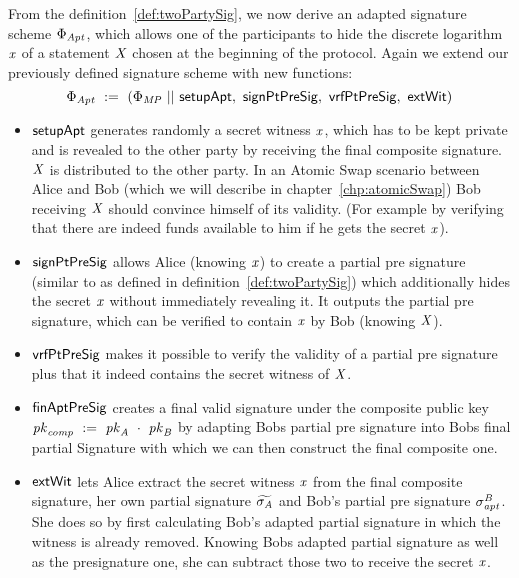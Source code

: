 
\begin{definition}
    \label{def:twoPartyFixedWitAptSig}
    From the definition~\ref{def:twoPartySig}, we now derive an adapted signature scheme $\Phi_{\mathit{Apt}}$, which allows one of the participants to hide the discrete logarithm $\mathit{x}$ of a statement $\mathit{X}$ chosen
    at the beginning of the protocol. Again we extend our previously defined signature scheme with new functions:
    \[ \Phi_{\mathit{Apt}} ~:=~ (\Phi_{\mathit{MP}} ~||~ \mathsf{setupApt} ,~ \mathsf{signPtPreSig} ,~ \mathsf{vrfPtPreSig} ,~ \mathsf{extWit}) \]
    \begin{itemize}
        \item $\mathsf{setupApt}$ generates randomly a secret witness $\mathit{x}$, which has to be kept private and is revealed to the other party by receiving the final composite signature. $\mathit{X}$ is distributed
        to the other party. In an Atomic Swap scenario between Alice and Bob (which we will describe in chapter~\ref{chp:atomicSwap}) Bob receiving $\mathit{X}$ should convince himself of its validity. (For example by verifying that
        there are indeed funds available to him if he gets the secret $\mathit{x}$).
        \item $\mathsf{signPtPreSig}$ allows Alice (knowing $\mathit{x}$) to create a partial pre signature (similar to as defined in definition~\ref{def:twoPartySig}) which additionally hides the secret $\mathit{x}$ without immediately revealing it.
        It outputs the partial pre signature, which can be verified to contain $\mathit{x}$ by Bob (knowing $\mathit{X}$).
        \item $\mathsf{vrfPtPreSig}$ makes it possible to verify the validity of a partial pre signature plus that it indeed contains the secret witness of $\mathit{X}$.
        \item $\mathsf{finAptPreSig}$ creates a final valid signature under the composite public key $\mathit{pk}_{\mathit{comp}} ~:=~ \mathit{pk}_{\mathit{A}} ~\cdot~ \mathit{pk}_{\mathit{B}}$ by adapting Bobs partial pre signature
        into Bobs final partial Signature with which we can then construct the final composite one.
        \item $\mathsf{extWit}$ lets Alice extract the secret witness $\mathit{x}$ from the final composite signature, her own partial signature $\widetilde{\sigma_{\mathit{A}}}$ and Bob's partial pre signature $\sigma^{\mathit{B}}_{\mathit{apt}}$. She does
        so by first calculating Bob's adapted partial signature in which the witness is already removed. Knowing Bobs adapted partial signature as well as the presignature one, she
        can subtract those two to receive the secret $\mathit{x}$.
    \end{itemize}
\end{definition}

